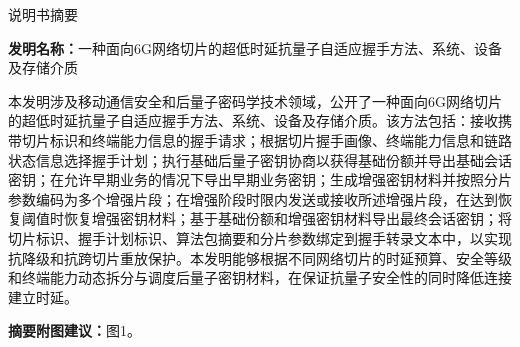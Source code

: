 \documentclass[12pt,a4paper]{article}
\begin{document}
\begin{center}
    {\Huge\heiti 说明书摘要}
\end{center}

\vspace{1em}

\noindent\textbf{发明名称：}一种面向6G网络切片的超低时延抗量子自适应握手方法、系统、设备及存储介质

\vspace{1em}

\noindent 本发明涉及移动通信安全和后量子密码学技术领域，公开了一种面向6G网络切片的超低时延抗量子自适应握手方法、系统、设备及存储介质。该方法包括：接收携带切片标识和终端能力信息的握手请求；根据切片握手画像、终端能力信息和链路状态信息选择握手计划；执行基础后量子密钥协商以获得基础份额并导出基础会话密钥；在允许早期业务的情况下导出早期业务密钥；生成增强密钥材料并按照分片参数编码为多个增强片段；在增强阶段时限内发送或接收所述增强片段，在达到恢复阈值时恢复增强密钥材料；基于基础份额和增强密钥材料导出最终会话密钥；将切片标识、握手计划标识、算法包摘要和分片参数绑定到握手转录文本中，以实现抗降级和抗跨切片重放保护。本发明能够根据不同网络切片的时延预算、安全等级和终端能力动态拆分与调度后量子密钥材料，在保证抗量子安全性的同时降低连接建立时延。

\vspace{1em}

\noindent\textbf{摘要附图建议：}图1。
\end{document}
